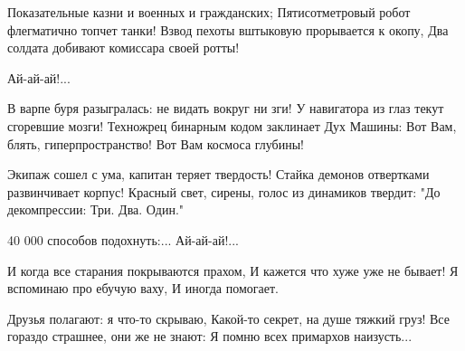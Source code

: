 Показательные казни и военных и гражданских;
Пятисотметровый робот флегматично топчет танки!
Взвод пехоты вштыковую прорывается к окопу,
Два солдата добивают комиссара своей ротты!

\endverse
\beginverse

Ай-ай-ай!...

\endverse
\beginverse

В варпе буря разыгралась: не видать вокруг ни зги!
У навигатора из глаз текут сгоревшие мозги!
Техножрец бинарным кодом заклинает Дух Машины:
Вот Вам, блять, гиперпространство! Вот Вам космоса глубины!

\endverse
\beginverse

Экипаж сошел с ума, капитан теряет твердость!
Стайка демонов отвертками развинчивает корпус!
Красный свет, сирены, голос из динамиков твердит:
"До декомпрессии: Три. Два. Один."

\endverse
\beginverse

40 000 способов подохнуть:...
Ай-ай-ай!...

\endverse
\beginverse

И когда все старания покрываются прахом,
И кажется что хуже уже не бывает!
Я вспоминаю про ебучую ваху,
И иногда помогает.

\endverse
\beginverse

Друзья полагают: я что-то скрываю,
Какой-то секрет, на душе тяжкий груз!
Все гораздо страшнее, они же не знают:
Я помню всех примархов наизусть...

\endverse
\endsong